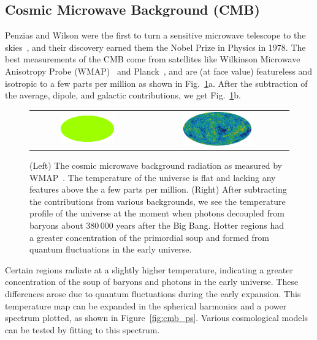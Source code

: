 \subsection{Cosmic Microwave Background (CMB)}

Penzias and Wilson were the first to turn a sensitive microwave telescope to the skies~\cite{Penzias:1965a,Penzias:1965b}, and their discovery earned them the Nobel Prize in Physics in 1978. The best measurements of the CMB come from satellites like Wilkinson Microwave Anisotropy Probe (WMAP)~\cite{Bennett:2012zja} and Planck~\cite{Ade:2015xua}, and are (at face value) featureless and isotropic to a few parts per million as shown in Fig.~\ref{fig:cmb}a. After the subtraction of the average, dipole, and galactic contributions, we get Fig.~\ref{fig:cmb}b.

\begin{figure}[htb]
    \begin{tabular}{cc}
    \includegraphics[width=0.5\textwidth]{figures/dm/CMB0} & \includegraphics[width=0.5\textwidth]{figures/dm/CMB3} \\
    \end{tabular}
    \caption{(Left) The cosmic microwave background radiation as measured by WMAP~\cite{Bennett:2012zja}. The temperature of the universe is flat and lacking any features above the a few parts per million. (Right) After subtracting the contributions from various backgrounds, we see the temperature profile of the universe at the moment when photons decoupled from baryons about $380\,000$ years after the Big Bang. Hotter regions had a greater concentration of the primordial soup and formed from quantum fluctuations in the early universe.}\label{fig:cmb}
\end{figure}

Certain regions radiate at a slightly higher temperature, indicating a greater concentration of the soup of baryons and photons in the early universe. These differences arose due to quantum fluctuations during the early expansion. This temperature map can be expanded in the spherical harmonics and a power spectrum plotted, as shown in Figure~\ref{fig:cmb_ps}. Various cosmological models can be tested by fitting to this spectrum.

